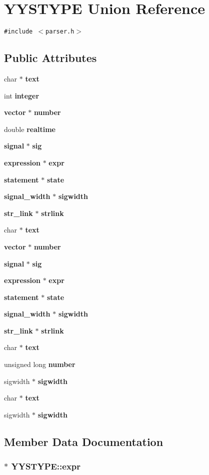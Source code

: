 \section{YYSTYPE  Union Reference}
\label{unionYYSTYPE}
{\tt \#include $<$parser.h$>$}

\subsection*{Public Attributes}
\begin{CompactItemize}
\item 
char $\ast$ {\bf text}
\item 
int {\bf integer}
\item 
{\bf vector} $\ast$ {\bf number}
\item 
double {\bf realtime}
\item 
{\bf signal} $\ast$ {\bf sig}
\item 
{\bf expression} $\ast$ {\bf expr}
\item 
{\bf statement} $\ast$ {\bf state}
\item 
{\bf signal\_\-width} $\ast$ {\bf sigwidth}
\item 
{\bf str\_\-link} $\ast$ {\bf strlink}
\item 
char $\ast$ {\bf text}
\item 
{\bf vector} $\ast$ {\bf number}
\item 
{\bf signal} $\ast$ {\bf sig}
\item 
{\bf expression} $\ast$ {\bf expr}
\item 
{\bf statement} $\ast$ {\bf state}
\item 
{\bf signal\_\-width} $\ast$ {\bf sigwidth}
\item 
{\bf str\_\-link} $\ast$ {\bf strlink}
\item 
char $\ast$ {\bf text}
\item 
unsigned long {\bf number}
\item 
sigwidth $\ast$ {\bf sigwidth}
\item 
char $\ast$ {\bf text}
\item 
sigwidth $\ast$ {\bf sigwidth}
\end{CompactItemize}


\subsection{Member Data Documentation}
\subsubsection{$\ast$ YYSTYPE::expr}\label{unionYYSTYPE_m12}


